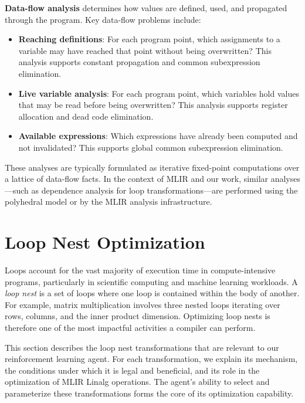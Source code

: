 \textbf{Data-flow analysis} determines how values are defined, used, and propagated through the program. Key data-flow problems include:

\begin{itemize}
    \item \textbf{Reaching definitions}: For each program point, which assignments to a variable may have reached that point without being overwritten? This analysis supports constant propagation and common subexpression elimination.
    \item \textbf{Live variable analysis}: For each program point, which variables hold values that may be read before being overwritten? This analysis supports register allocation and dead code elimination.
    \item \textbf{Available expressions}: Which expressions have already been computed and not invalidated? This supports global common subexpression elimination.
\end{itemize}

These analyses are typically formulated as iterative fixed-point computations over a lattice of data-flow facts. In the context of MLIR and our work, similar analyses—such as dependence analysis for loop transformations—are performed using the polyhedral model or by the MLIR analysis infrastructure.

\section{Loop Nest Optimization}

Loops account for the vast majority of execution time in compute-intensive programs, particularly in scientific computing and machine learning workloads. A \textit{loop nest} is a set of loops where one loop is contained within the body of another. For example, matrix multiplication involves three nested loops iterating over rows, columns, and the inner product dimension. Optimizing loop nests is therefore one of the most impactful activities a compiler can perform.

This section describes the loop nest transformations that are relevant to our reinforcement learning agent. For each transformation, we explain its mechanism, the conditions under which it is legal and beneficial, and its role in the optimization of MLIR Linalg operations. The agent's ability to select and parameterize these transformations forms the core of its optimization capability.

